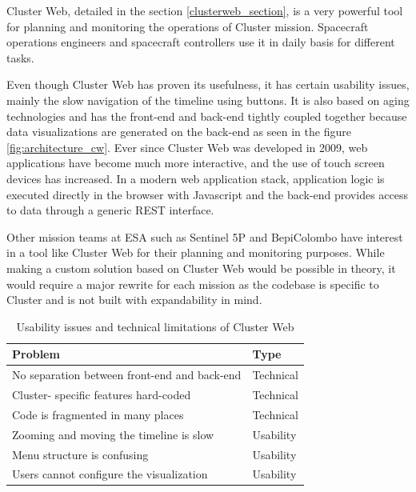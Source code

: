 Cluster Web, detailed in the section \ref{clusterweb_section}, is a very powerful tool for planning and monitoring the operations of Cluster mission. Spacecraft operations engineers and spacecraft controllers use it in daily basis for different tasks.

Even though Cluster Web has proven its usefulness, it has certain usability issues, mainly the slow navigation of the timeline using buttons. It is also based on aging technologies and has the front-end and back-end tightly coupled together because data visualizations are generated on the back-end as seen in the figure \ref{fig:architecture_cw}. Ever since Cluster Web was developed in 2009, web applications have become much more interactive, and the use of touch screen devices has increased. In a modern web application stack, application logic is executed directly in the browser with Javascript and the back-end provides access to data through a generic REST interface.

Other mission teams at ESA such as Sentinel 5P and BepiColombo have interest in a tool like Cluster Web for their planning and monitoring purposes. While making a custom solution based on Cluster Web would be possible in theory, it would require a major rewrite for each mission as the codebase is specific to Cluster and is not built with expandability in mind.

\begin{table}[!ht]
\def\arraystretch{1.1}%
    \begin{center}
    \caption{Usability issues and technical limitations of Cluster Web}
    \label{clusterweb_problems}
    \begin{tabular}{| l | l | }
    \hline
    Problem & Type  \\
    \hline
    No separation between front-end and back-end    &  Technical       \\
    Cluster- specific features hard-coded    &  Technical       \\
    Code is fragmented in many places    &  Technical       \\
    Zooming and moving the timeline is slow    &  Usability       \\
    Menu structure is confusing    &  Usability       \\
    Users cannot configure the visualization    &  Usability       \\
    \hline
    \end{tabular}
    \end{center}
\end{table}

